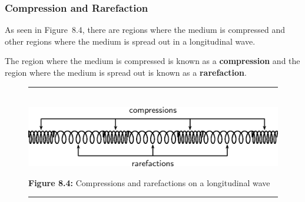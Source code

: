             \subsubsection{ Compression and Rarefaction}
            \nopagebreak
        \label{m38782*id292360}As seen in Figure~8.4, there are regions where the medium is compressed and other regions where the medium is spread out in a longitudinal wave.\par 
        \label{m38782*id292369}The region where the medium is compressed is known as a \textbf{compression} and the region where the medium is spread out is known as a \textbf{rarefaction}.\par 
    \setcounter{subfigure}{0}
	\begin{figure}[H] %
    \begin{center}
    \rule[.1in]{\figurerulewidth}{.005in} \\
        \label{m38782*uid7!!!underscore!!!media}\label{m38782*uid7!!!underscore!!!printimage}\includegraphics[width=0.8\columnwidth]{col11305.imgs/m38782_PG11C4_004.png} %
      \vspace{2pt}
    \vspace{\rubberspace}\par \begin{cnxcaption}
	  \small \textbf{Figure 8.4: }Compressions and rarefactions on a longitudinal wave
	\end{cnxcaption}
    \vspace{.1in}
    \rule[.1in]{\figurerulewidth}{.005in} \\
    \end{center}
 \end{figure}       
      \label{m38782*uid8}
